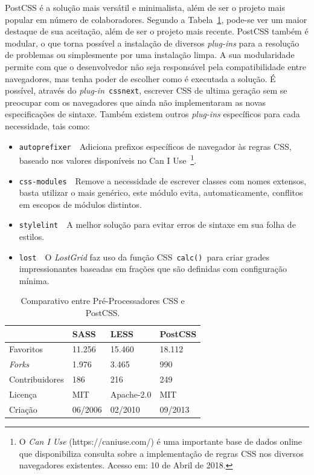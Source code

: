 PostCSS é a solução mais versátil e minimalista, além de ser o projeto mais popular em número de colaboradores. Segundo a Tabela~\ref{tab:postcss}, pode-se ver um maior destaque de sua aceitação, além de ser o projeto mais recente. PostCSS também é modular, o que torna possível a instalação de diversos \textit{plug-ins} para a resolução de problemas ou simplesmente por uma instalação limpa. A sua modularidade permite com que o desenvolvedor não seja responsável pela compatibilidade entre navegadores, mas tenha poder de escolher como é executada a solução. É possível, através do \textit{plug-in}~\texttt{cssnext}, escrever CSS de ultima geração sem se preocupar com os navegadores que ainda não implementaram as novas especificações de sintaxe. Também existem outros \textit{plug-ins} específicos para cada necessidade, tais como:
\begin{itemize}
    \item \texttt{autoprefixer}~\textemdash~Adiciona prefixos específicos de navegador às regras CSS, baseado nos valores disponíveis no Can I Use~\footnote{O \textit{Can I Use} (https://caniuse.com/) é uma importante base de dados online que disponibiliza consulta sobre a implementação de regras CSS nos diversos navegadores existentes. Acesso em: 10 de Abril de 2018.}.
    \item \texttt{css-modules}~\textemdash~Remove a necessidade de escrever classes com nomes extensos, basta utilizar o mais genérico, este módulo evita, automaticamente, conflitos em escopos de módulos distintos.
    \item \texttt{stylelint}~\textemdash~A melhor solução para evitar erros de sintaxe em sua folha de estilos.
    \item \texttt{lost}~\textemdash~O \textit{LostGrid} faz uso da função CSS~\texttt{calc()}~para criar grades impressionantes baseadas em frações que são definidas com configuração mínima.
\end{itemize}

\begin{table}[th]
\centering
\caption{Comparativo entre Pré-Processadores CSS e PostCSS.}
\label{tab:postcss}
\begin{tabular}{llll}
                &   SASS    &   LESS        &   PostCSS\\\hline

Favoritos       &   11.256  &   15.460      &   18.112\\
\textit{Forks}  &   1.976   &   3.465       &   990\\
Contribuidores  &   186     &   216         &   249\\
Licença         &   MIT     &   Apache-2.0  &   MIT\\
Criação         &   06/2006 &   02/2010     &   09/2013\\
\hline
\end{tabular}
\begin{flushleft}
\end{flushleft}
\end{table}

